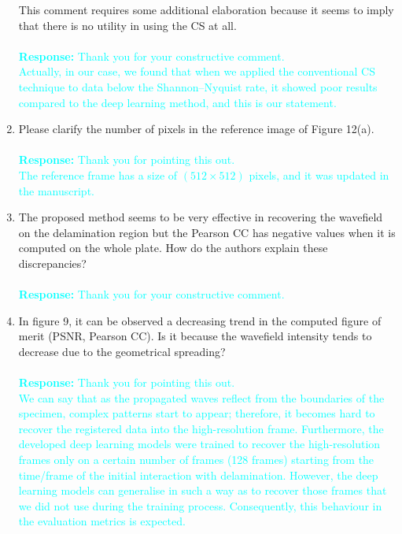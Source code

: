\documentclass[11pt,a2paper]{report}
\begin{document}
\begin{enumerate}
		This comment requires some additional elaboration because it seems to imply that there is no utility in using the CS at all. 		
		\\	\\
		\textcolor{Cyan}
		{
			\textbf{Response:}
			Thank you for your constructive comment. \\
			Actually, in our case, we found that when we applied the conventional CS technique to data below the Shannon–Nyquist rate, it showed poor results compared to the deep learning method, and this is our statement. 
		} 
		\item Please clarify the number of pixels in the reference image of Figure 12(a). 
		\\ \\
		\textcolor{Cyan}
		{
			\textbf{Response:}
			Thank you for pointing this out. \\
			The reference frame has a size of \((512\times512)\) pixels, and it was updated in the manuscript.
		}	
		\item The proposed method seems to be very effective in recovering the wavefield on the delamination region but the Pearson CC has negative values when it is computed on the whole plate. 
		How do the authors explain these discrepancies?
		\\ \\
		\textcolor{Cyan}
		{
			\textbf{Response:}
			Thank you for your constructive comment.\\ 	
		}
		\item In figure 9, it can be observed a decreasing trend in the computed figure of merit (PSNR, Pearson CC). 
		Is it because the wavefield intensity tends to decrease due to the geometrical spreading?
		\\ \\
		\textcolor{Cyan}
		{
			\textbf{Response:}
			Thank you for pointing this out. \\
			We can say that as the propagated waves reflect from the boundaries of the specimen, complex patterns start to appear; therefore, it becomes hard to recover the registered data into the high-resolution frame.
			Furthermore, the developed deep learning models were trained to recover the high-resolution frames only on a certain number of frames (128 frames) starting from the time/frame of the initial interaction with delamination.
			However, the deep learning models can generalise in such a way as to recover those frames that we did not use during the training process.
			Consequently, this behaviour in the evaluation metrics is expected.
		}
	\end{enumerate}
	
\end{document}
